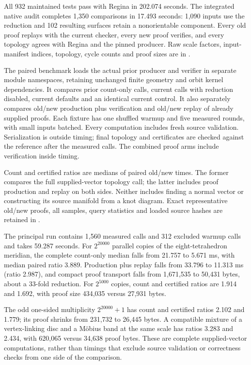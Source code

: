 All 932 maintained tests pass with Regina in 202.074 seconds. The integrated
native audit completes 1,350 comparisons in 17.493 seconds: 1,090 inputs
use the reduction and 102 resulting surfaces retain a nonorientable
component. Every old proof replays with the current checker, every new
proof verifies, and every topology agrees with Regina and the pinned
producer. Raw scale factors, input-manifest indices, topology, cycle counts
and proof sizes are in .

The paired benchmark loads the actual prior producer and verifier in
separate module namespaces, retaining unchanged finite geometry and orbit
kernel dependencies. It compares prior count-only calls, current calls with
reduction disabled, current defaults and an identical current control. It
also separately compares old/new production plus verification and old/new
replay of already supplied proofs. Each fixture has one shuffled warmup and
five measured rounds, with small inputs batched. Every computation includes
fresh source validation. Serialization is outside timing; final topology
and certificates are checked against the reference after the measured
calls. The combined proof arms include verification inside timing.



Count and certified ratios are medians of paired old/new times. The former
compares the full supplied-vector topology call; the latter includes proof
production and replay on both sides. Neither includes finding a normal
vector or constructing its source manifold from a knot diagram. Exact
representative old/new proofs, all samples, query statistics and loaded
source hashes are retained in
.

The principal run contains 1,560 measured calls and 312 excluded warmup
calls and takes 59.287 seconds. For $2^{20000}$ parallel copies of the
eight-tetrahedron meridian, the complete count-only median falls from
21.757 to 5.671 ms, with median paired ratio 3.889. Production plus replay
falls from 33.796 to 11.313 ms (ratio 2.987), and compact proof transport
falls from 1,671,535 to 50,431 bytes, about a 33-fold reduction.
For $2^{5000}$ copies, count and certified ratios are 1.914 and 1.692,
with proof size 434,035 versus 27,931 bytes.

The odd one-sided multiplicity $2^{20000}+1$ has count and certified ratios
2.102 and 1.779; its proof shrinks from 231,732 to 26,445 bytes. A compatible
mixture of a vertex-linking disc and a M\"obius band at the same scale has
ratios 3.283 and 2.434, with 620,065 versus 34,638 proof bytes. These are
complete supplied-vector computations, rather than timings that exclude
source validation or correctness checks from one side of the comparison.

